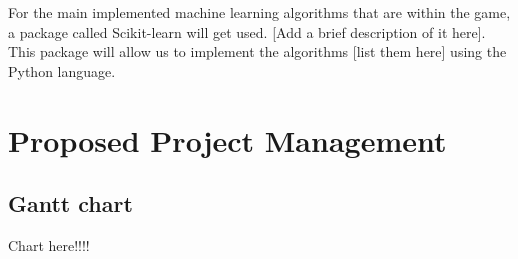 \documentclass[a4paper,10pt]{article}
\begin{document}
For the main implemented machine learning algorithms that are within the game, a package called Scikit-learn will get used. [Add a brief description of it here]. This package will allow us to implement the algorithms [list them here] using the Python language.

\section{Proposed Project Management}


\begin{landscape}
\subsection{Gantt chart}
	Chart here!!!!
\end{landscape}
%	

	
	
	
	
\end{document}
